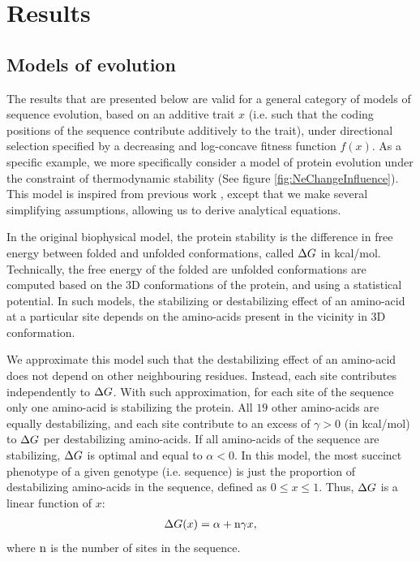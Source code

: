 \documentclass{article}
\begin{document}
	\section*{Results}
	
	\subsection*{Models of evolution}
	
	The results that are presented below are valid for a general category of models of sequence evolution, based on an additive trait $x$ (i.e. such that the coding positions of the sequence contribute additively to the trait), under directional selection specified by a decreasing and log-concave fitness function $f(x)$. As a specific example, we more specifically consider a model of protein evolution under the constraint of thermodynamic stability (See figure \ref{fig:NeChangeInfluence}). This model is inspired from previous work \cite{Williams2006, Goldstein2011, Pollock2012}, except that we make several simplifying assumptions, allowing us to derive analytical equations. 
	
	In the original biophysical model, the protein stability is the difference in free energy between folded and unfolded conformations, called $\Delta G$ in kcal/mol.
	Technically, the free energy of the folded are unfolded conformations are computed based on the $3$D conformations of the protein, and using a statistical potential.
	In such models, the stabilizing or destabilizing effect of an amino-acid at a particular site depends on the amino-acids present in the vicinity in $3$D conformation.
	
	We approximate this model such that the destabilizing effect of an amino-acid does not depend on other neighbouring residues.
	Instead, each site contributes independently to $\Delta G$. 
	With such approximation, for each site of the sequence only one amino-acid is stabilizing the protein. 
	All $19$ other amino-acids are equally destabilizing, and each site contribute to an excess of $\gamma > 0$ (in kcal/mol) to $\Delta G$ per destabilizing amino-acids.
	If all amino-acids of the sequence are stabilizing, $\Delta G$ is optimal and equal to $ \alpha < 0$. 
	In this model, the most succinct phenotype of a given genotype (i.e. sequence) is just the proportion of destabilizing amino-acids in the sequence, defined as $0 \leq x \leq 1$. Thus, $\Delta G$ is a linear function of $x$:
	\begin{align}
		\Delta G (x) = \alpha + \text{n} \gamma x,
	\end{align}
	where $\text{n}$ is the number of sites in the sequence. 
	
\end{document}
